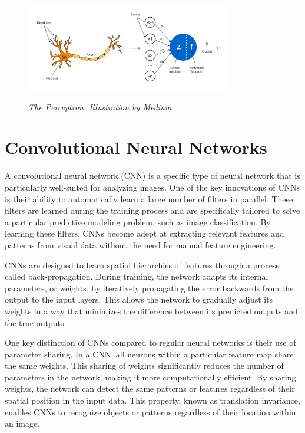 \begin{figure}[H]
  \centering
  \includegraphics[width=0.8\textwidth]{imatges/preliminaries/perceptron.png}
  \caption[The Perceptron]{\textit{The Perceptron. Illustration by Medium}}
  {\label{fig:perceptron}}
\end{figure}

\newpage

\section{Convolutional Neural Networks}

A convolutional neural network (CNN) is a specific type of neural network that
is particularly well-suited for analyzing images. One of the key innovations of
CNNs is their ability to automatically learn a large number of filters in
parallel. These filters are learned during the training process and are
specifically tailored to solve a particular predictive modeling problem, such
as image classification. By learning these filters, CNNs become adept at
extracting relevant features and patterns from visual data without the need for
manual feature engineering. \newline

CNNs are designed to learn spatial hierarchies of features through a process
called back-propagation. During training, the network adapts its internal
parameters, or weights, by iteratively propagating the error backwards from the
output to the input layers. This allows the network to gradually adjust its
weights in a way that minimizes the difference between its predicted outputs
and the true outputs. \newline

One key distinction of CNNs compared to regular neural networks is their use of
parameter sharing. In a CNN, all neurons within a particular feature map share
the same weights. This sharing of weights significantly reduces the number of
parameters in the network, making it more computationally efficient. By sharing
weights, the network can detect the same patterns or features regardless of
their spatial position in the input data. This property, known as translation
invariance, enables CNNs to recognize objects or patterns regardless of their
location within an image.\newline

